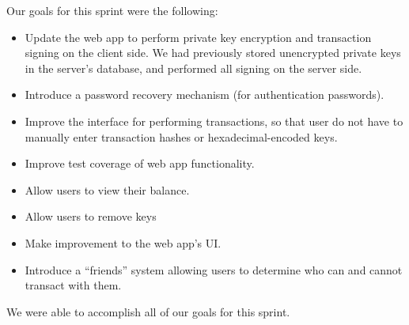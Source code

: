 \documentclass[a4paper,12pt]{article}
\begin{document}
Our goals for this sprint were the following:
\begin{itemize}
\item Update the web app to perform private key encryption and transaction signing on the client side. We had previously stored unencrypted private keys in the server's database, and performed all signing on the server side.
\item Introduce a password recovery mechanism (for authentication passwords).
\item Improve the interface for performing transactions, so that user do not have to manually enter transaction hashes or hexadecimal-encoded keys.
\item Improve test coverage of web app functionality.
\item Allow users to view their balance.
\item Allow users to remove keys
\item Make improvement to the web app's UI.
\item Introduce a ``friends'' system allowing users to determine who can and cannot transact with them.
\end{itemize}

\bigskip\noindent We were able to accomplish all of our goals for this sprint.
\end{document}
